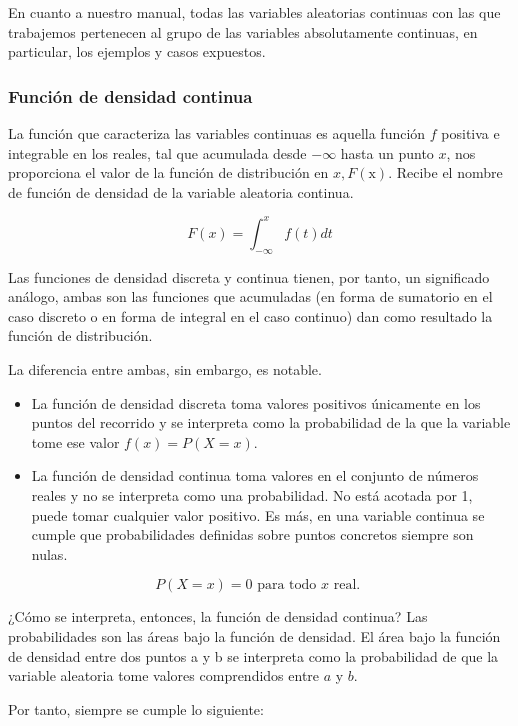 \documentclass[
]{article}
\providecommand{\tightlist}{%
  \setlength{\itemsep}{0pt}\setlength{\parskip}{0pt}}
\begin{document}
En cuanto a nuestro manual, todas las variables aleatorias continuas con
las que trabajemos pertenecen al grupo de las variables absolutamente
continuas, en particular, los ejemplos y casos expuestos.

\subsubsection{Función de densidad continua}\label{funciuxf3n-de-densidad-continua}

La función que caracteriza las variables continuas es aquella función
\(f\) positiva e integrable en los reales, tal que acumulada desde
\(-\infty\) hasta un punto \(x\), nos proporciona el valor de la función de
distribución en \(x, F(\mathrm{x})\). Recibe el nombre de función de
densidad de la variable aleatoria continua.

\[
F(x)=\int_{-\infty}^{x} f(t) d t
\]

Las funciones de densidad discreta y continua tienen, por tanto, un
significado análogo, ambas son las funciones que acumuladas (en forma de
sumatorio en el caso discreto o en forma de integral en el caso
continuo) dan como resultado la función de distribución.

La diferencia entre ambas, sin embargo, es notable.

\begin{itemize}
\tightlist
\item
  La función de densidad discreta toma valores positivos únicamente en
  los puntos del recorrido y se interpreta como la probabilidad de la
  que la variable tome ese valor \(f(x)=P(X=x)\).
\item
  La función de densidad continua toma valores en el conjunto de
  números reales y no se interpreta como una probabilidad. No está
  acotada por 1, puede tomar cualquier valor positivo. Es más, en una
  variable continua se cumple que probabilidades definidas sobre
  puntos concretos siempre son nulas.
\end{itemize}

\[
P(X=x)=0 \text { para todo } x \text { real. }
\]

¿Cómo se interpreta, entonces, la función de densidad continua? Las
probabilidades son las áreas bajo la función de densidad. El área bajo
la función de densidad entre dos puntos a y b se interpreta como la
probabilidad de que la variable aleatoria tome valores comprendidos
entre \(a\) y \(b\).

Por tanto, siempre se cumple lo siguiente:
\end{document}
